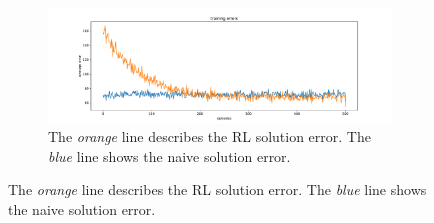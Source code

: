\documentclass[conference]{IEEEtran}
\begin{document}
\begin{figure}
  \begin{subfigure}[b]{\textwidth}
    \centering
    \includegraphics[width=\textwidth]{img/mean-error}
    \caption{The \textit{orange} line 
    describes the RL solution error. The \textit{blue} line shows
    the naive solution error.}
    \hspace{5mm}
  \end{subfigure}
  

\end{figure}
\end{document}
